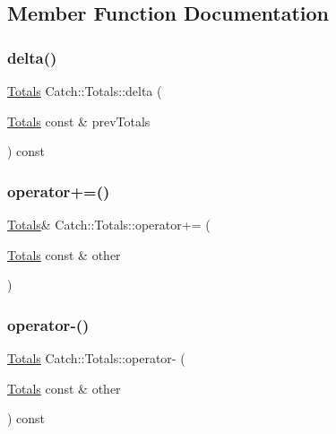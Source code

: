 \subsection{Member Function Documentation}
\hypertarget{struct_catch_1_1_totals_a1a94a654f5f3786b75695e081fc9bca2}{}\label{struct_catch_1_1_totals_a1a94a654f5f3786b75695e081fc9bca2} 
\subsubsection{\texorpdfstring{delta()}{delta()}}
{\footnotesize\ttfamily \hyperlink{struct_catch_1_1_totals}{Totals} Catch\+::\+Totals\+::delta (\begin{DoxyParamCaption}\item[{\hyperlink{struct_catch_1_1_totals}{Totals} const \&}]{prev\+Totals }\end{DoxyParamCaption}) const\hspace{0.3cm}{\ttfamily [inline]}}

\hypertarget{struct_catch_1_1_totals_a574015076e54cc405c70b053e3356e43}{}\label{struct_catch_1_1_totals_a574015076e54cc405c70b053e3356e43} 
\subsubsection{\texorpdfstring{operator+=()}{operator+=()}}
{\footnotesize\ttfamily \hyperlink{struct_catch_1_1_totals}{Totals}\& Catch\+::\+Totals\+::operator+= (\begin{DoxyParamCaption}\item[{\hyperlink{struct_catch_1_1_totals}{Totals} const \&}]{other }\end{DoxyParamCaption})\hspace{0.3cm}{\ttfamily [inline]}}

\hypertarget{struct_catch_1_1_totals_a9279ed39139cb7e7b291918a6d08290e}{}\label{struct_catch_1_1_totals_a9279ed39139cb7e7b291918a6d08290e} 
\subsubsection{\texorpdfstring{operator-\/()}{operator-()}}
{\footnotesize\ttfamily \hyperlink{struct_catch_1_1_totals}{Totals} Catch\+::\+Totals\+::operator-\/ (\begin{DoxyParamCaption}\item[{\hyperlink{struct_catch_1_1_totals}{Totals} const \&}]{other }\end{DoxyParamCaption}) const\hspace{0.3cm}{\ttfamily [inline]}}



